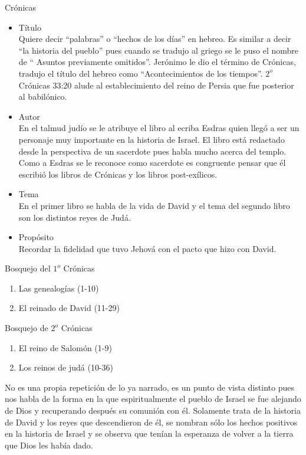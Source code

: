 %

%
\begin{section}{Crónicas}
	\begin{itemize}
		\item Título\\
			Quiere decir ``palabras'' o ``hechos de los días'' en hebreo. Es similar a decir ``la historia del pueblo'' pues cuando se tradujo al griego se le puso el nombre de `` Asuntos previamente omitidos''. Jerónimo le dio el término de Crónicas, tradujo el título del hebreo como ``Acontecimientos de los tiempos''. $2^{o}$ Crónicas 33:20 alude al establecimiento del reino de Persia que fue posterior al babilónico.
		\item Autor\\
			En el talmud judío se le atribuye el libro al ecriba Esdras quien llegó a ser un personaje muy importante en la historia de Israel. El libro está redactado desde la perspectiva de un sacerdote pues habla mucho acerca del templo. Como a Esdras se le reconoce como sacerdote es congruente pensar que él escribió los libros de Crónicas y los libros post-exílicos.
		\item Tema\\
			En el primer libro se habla de la vida de David y el tema del segundo libro son los distintos reyes de Judá.
		\item Propósito\\
			Recordar la fidelidad que tuvo Jehová con el pacto que hizo con David.
	\end{itemize}
	\begin{subsection}{Bosquejo del $1^{o}$ Crónicas}
		\begin{enumerate}
			\item Las genealogías (1-10)
			\item El reinado de David (11-29)
		\end{enumerate}
		\begin{subsection}{Bosquejo de $2^{o}$ Crónicas}
			\begin{enumerate}
				\item El reino de Salomón (1-9)
				\item Los reinos de judá (10-36)
			\end{enumerate}
		\end{subsection}
		No es una propia repetición de lo ya narrado, es un punto de vista distinto pues nos habla de la forma en la que espiritualmente el pueblo de Israel se fue alejando de Dios y recuperando después su comunión con él. Solamente trata de la historia de David y los reyes que descendieron de él, se nombran sólo los hechos positivos en la historia de Israel y se observa que tenían la esperanza de volver a la tierra que Dios les había dado.
	\end{subsection}
\end{section}
%


